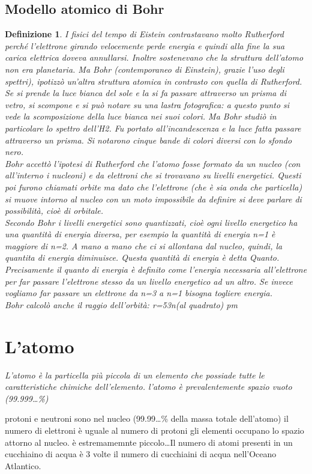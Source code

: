\documentclass{book}
\newtheorem{defi}{Definizione}[section]
\begin{document}
\subsection{Modello atomico di Bohr}
\label{sec:bohr}
\begin{defi}
  I fisici del tempo di Eistein contrastavano molto Rutherford perché l’elettrone girando velocemente perde energia e quindi alla fine la sua carica elettrica doveva annullarsi. Inoltre sostenevano che la struttura dell’atomo non era planetaria. Ma Bohr (contemporaneo di Einstein), grazie l’uso degli spettri), ipotizzò un’altra struttura atomica in contrasto con quella di Rutherford.\\
Se si prende la luce bianca del sole e la si fa passare attraverso un prisma di vetro, si scompone e si può notare su una lastra fotografica: a questo punto si vede la scomposizione della luce bianca nei suoi colori. Ma Bohr studiò in particolare lo spettro dell’H2. Fu portato all’incandescenza e la luce fatta passare attraverso un prisma. Si notarono cinque bande di colori diversi con lo sfondo nero.\\
Bohr accettò l’ipotesi di Rutherford che l’atomo fosse formato da un nucleo (con all’interno i nucleoni) e da elettroni che si trovavano su livelli energetici. Questi poi furono chiamati orbite ma dato che l’elettrone (che è sia onda che particella) si muove intorno al nucleo con un moto impossibile da definire si deve parlare di possibilità, cioè di orbitale.\\
Secondo Bohr i livelli energetici sono quantizzati, cioè ogni livello energetico ha una quantità di energia diversa, per esempio la quantità di energia n=1 è maggiore di n=2. A mano a mano che ci si allontana dal nucleo, quindi, la quantita di energia diminuisce. Questa quantità di energia è detta Quanto. Precisamente il quanto di energia è definito come l’energia necessaria all’elettrone per far passare l’elettrone stesso da un livello energetico ad un altro. Se invece vogliamo far passare un elettrone da n=3 a n=1 bisogna togliere energia.\\
Bohr calcolò anche il raggio dell’orbità: r=53n(al quadrato) pm
\end{defi}

\section{L'atomo}
\label{sec:l'atomo}
\textit{L'atomo è la particella più piccola di un elemento che possiade tutte le caratteristiche chimiche
  dell'elemento. l'atomo è prevalentemente spazio vuoto (99.999\dots\%)}
\begin{tasks}
  \task protoni e neutroni sono nel nucleo (99.99\dots\% della massa totale dell'atomo)
  \task il numero di elettroni è uguale al numero di protoni
  \task gli elementi occupano lo spazio attorno al nucleo.
  \task è estremamemnte piccolo\dots Il numero di atomi presenti in un cucchiaino di acqua è 3 volte il numero di
  cucchiaini di acqua nell'Oceano Atlantico.
\end{tasks}
\end{document}
